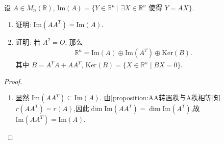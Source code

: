 \documentclass[../../main.tex]{subfiles}%
\begin{document}
\begin{example}
设 $A \in M_n(\mathbb{R})$, $\text{Im}(A) = \{Y \in \mathbb{R}^n \mid \exists X \in \mathbb{R}^n \text{ 使得 } Y = AX\}$.
\begin{enumerate}[(1)]
\item 证明: $\text{Im}(AA^T) = \text{Im}(A)$.

\item 证明: 若 $A^2 = O$, 那么
\begin{align*}
\mathbb{R}^n = \text{Im}(A) \oplus \text{Im}(A^T) \oplus \text{Ker}(B).
\end{align*}
其中 $B = A^T A + AA^T$, $\text{Ker}(B) = \{X \in \mathbb{R}^n \mid BX = 0\}$.
\end{enumerate}
\end{example}
\begin{proof}
\begin{enumerate}[(1)]
\item 显然 $\text{Im}(AA^T) \subseteq \text{Im}(A)$.
由\cref{proposition:AA转置秩与A秩相等}知$r(AA^T) = r(A)$,因此$\dim \text{Im}(AA^T) =\dim \text{Im}(A^T)$,故$\text{Im}(AA^T) = \text{Im}(A)$.


\end{enumerate}
\end{proof}
\end{document}
